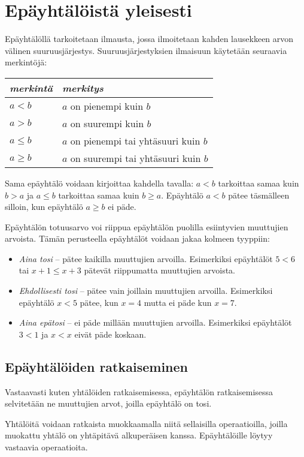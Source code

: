 \section{Epäyhtälöistä yleisesti}
Epäyhtälöllä tarkoitetaan ilmausta, jossa ilmoitetaan kahden lausekkeen arvon välinen suuruusjärjestys. Suuruusjärjestyksien ilmaisuun käytetään seuraavia merkintöjä:

\begin{center}
\begin{tabular}{l|l}
\emph{merkintä} & \emph{merkitys} \\
\hline
$a<b$ &  $a$ on pienempi kuin $b$ \\
$a>b$ & $a$ on suurempi kuin $b$ \\
$a \leq b$ & $a$ on pienempi tai yhtäsuuri kuin $b$ \\
$a \geq b$ & $a$ on suurempi tai yhtäsuuri kuin $b$ \\
\end{tabular}
\end{center}

Sama epäyhtälö voidaan kirjoittaa kahdella tavalla: $a < b$ tarkoittaa samaa kuin $b > a$ ja $a \leq b$ tarkoittaa samaa kuin $b \geq a$. Epäyhtälö $a < b$ pätee täsmälleen silloin, kun epäyhtälö $a \geq b$ ei päde.

Epäyhtälön totuusarvo voi riippua epäyhtälön puolilla esiintyvien muuttujien arvoista. Tämän perusteella epäyhtälöt voidaan jakaa kolmeen tyyppiin:
\begin{itemize}
\item \emph{Aina tosi} -- pätee kaikilla muuttujien arvoilla. Esimerkiksi epäyhtälöt $5 < 6$ tai $x + 1 \leq x + 3$ pätevät riippumatta muuttujien arvoista.
\item \emph{Ehdollisesti tosi} -- pätee vain joillain muuttujien arvoilla. Esimerkiksi epäyhtälö $x < 5$ pätee, kun $x = 4$ mutta ei päde kun $x = 7$.
\item \emph{Aina epätosi} -- ei päde millään muuttujien arvoilla. Esimerkiksi epäyhtälöt $3 < 1$ ja $x < x$ eivät päde koskaan.
\end{itemize}

\subsection*{Epäyhtälöiden ratkaiseminen}
Vastaavasti kuten yhtälöiden ratkaisemisessa, epäyhtälön ratkaisemisessa selvitetään ne muuttujien arvot, joilla epäyhtälö on tosi.

Yhtälöitä voidaan ratkaista muokkaamalla niitä sellaisilla operaatioilla, joilla muokattu yhtälö on yhtäpitävä alkuperäisen kanssa. Epäyhtälöille löytyy vastaavia operaatioita.

